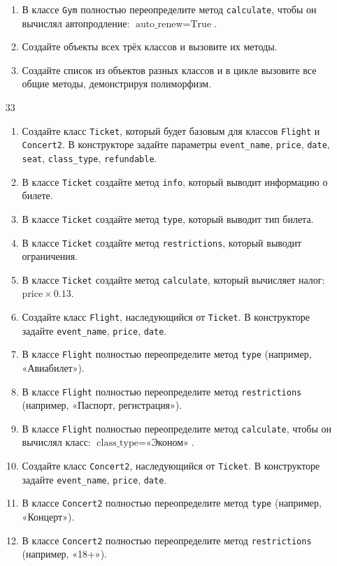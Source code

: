 \begin{enumerate}
\begin{enumerate}
    \item В классе \texttt{Gym} полностью переопределите метод \texttt{calculate}, чтобы он вычислял автопродление: \( \text{auto\_renew} = \text{True} \).
    \item Создайте объекты всех трёх классов и вызовите их методы.
    \item Создайте список из объектов разных классов и в цикле вызовите все общие методы, демонстрируя полиморфизм.
\end{enumerate}
\item[33]
\begin{enumerate}
    \item Создайте класс \texttt{Ticket}, который будет базовым для классов \texttt{Flight} и \texttt{Concert2}. В конструкторе задайте параметры \texttt{event\_name}, \texttt{price}, \texttt{date}, \texttt{seat}, \texttt{class\_type}, \texttt{refundable}.
    \item В классе \texttt{Ticket} создайте метод \texttt{info}, который выводит информацию о билете.
    \item В классе \texttt{Ticket} создайте метод \texttt{type}, который выводит тип билета.
    \item В классе \texttt{Ticket} создайте метод \texttt{restrictions}, который выводит ограничения.
    \item В классе \texttt{Ticket} создайте метод \texttt{calculate}, который вычисляет налог: \( \text{price} \times 0.13 \).
    \item Создайте класс \texttt{Flight}, наследующийся от \texttt{Ticket}. В конструкторе задайте \texttt{event\_name}, \texttt{price}, \texttt{date}.
    \item В классе \texttt{Flight} полностью переопределите метод \texttt{type} (например, «Авиабилет»).
    \item В классе \texttt{Flight} полностью переопределите метод \texttt{restrictions} (например, «Паспорт, регистрация»).
    \item В классе \texttt{Flight} полностью переопределите метод \texttt{calculate}, чтобы он вычислял класс: \( \text{class\_type} = \text{«Эконом»} \).
    \item Создайте класс \texttt{Concert2}, наследующийся от \texttt{Ticket}. В конструкторе задайте \texttt{event\_name}, \texttt{price}, \texttt{date}.
    \item В классе \texttt{Concert2} полностью переопределите метод \texttt{type} (например, «Концерт»).
    \item В классе \texttt{Concert2} полностью переопределите метод \texttt{restrictions} (например, «18+»).

\end{enumerate}
\end{enumerate}
